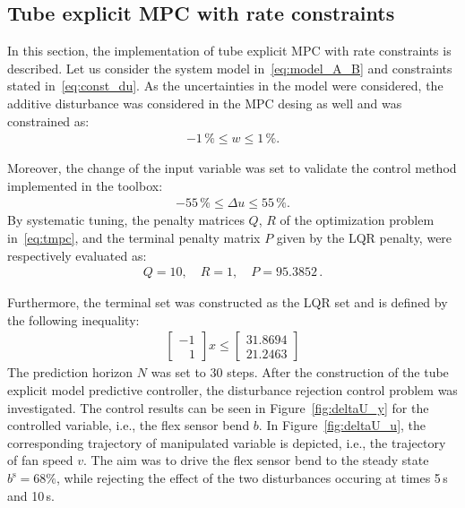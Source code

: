 \documentclass[letterpaper, 10 pt, conference]{ieeeconf}
\begin{document}
\subsection{Tube explicit MPC with rate constraints}
\label{sec:tube_exp}

In this section, the implementation of tube explicit MPC with rate constraints is described. Let us consider the system model in~\eqref{eq:model_A_B} and constraints stated in~\eqref{eq:const_du}. 
As the uncertainties in the model were considered, the additive disturbance was considered in the MPC desing as well and was constrained as:
\begin{eqnarray}
	\label{eq:const_w}
	-1\,\% \le w \le 1\,\%.
\end{eqnarray}

Moreover, the change of the input variable was set to validate the control method implemented in the toolbox:
\begin{eqnarray}
	\label{eq:const_du}
	-55\,\% \le \Delta u \le 55\,\%.
\end{eqnarray}
By systematic tuning, the penalty matrices $Q$, $R$ of the optimization problem in~\eqref{eq:tmpc}, and the terminal penalty matrix $P$ given by the LQR penalty, were respectively evaluated as:
\begin{eqnarray}
\label{eq:setup_penalty}
Q = 10, \quad R = 1, \quad P = 95.3852 \, .
\end{eqnarray}

Furthermore, the terminal set was constructed as the LQR set and is defined by the following inequality:
\begin{eqnarray}
	\label{eq:setup_terminal_set}
	\begin{bmatrix}
	-1 \\	
	\,\,\,\,\, 1
	\end{bmatrix} x \le 
	\begin{bmatrix}
		31.8694\\	
		21.2463
	\end{bmatrix}
\end{eqnarray}
The prediction horizon $N$ was set to 30 steps. After the construction of the tube explicit model predictive controller, the disturbance rejection control problem was investigated. The control results can be seen in Figure~\ref{fig:deltaU_y} for the controlled variable, i.e., the flex sensor bend $b$. In Figure~\ref{fig:deltaU_u}, the corresponding trajectory of manipulated variable is depicted, i.e., the trajectory of fan speed $v$. The aim was to drive the flex sensor bend to the steady state $ b^\mathrm{s} = 68\%$, while rejecting the effect of the two disturbances occuring at times 5\,s and 10\,s. 
\end{document}
